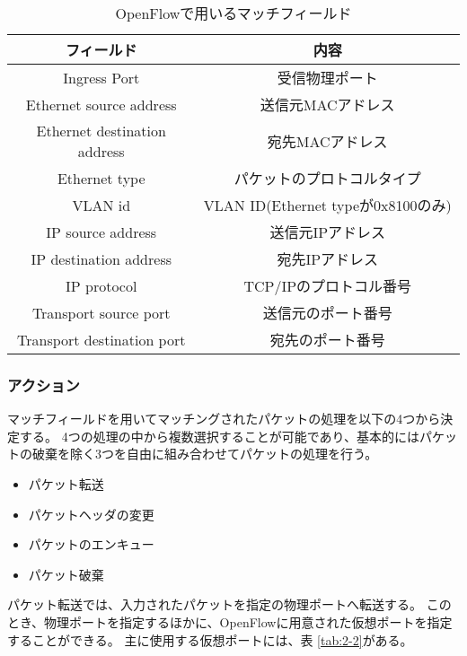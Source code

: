 \begin{table}[tb]
	\begin{center}
		\caption{OpenFlowで用いるマッチフィールド}
		\begin{tabular}{c|c}
			\hline \hline
			フィールド & 内容　\\ \hline
			Ingress Port & 受信物理ポート　\\
			Ethernet source address & 送信元MACアドレス \\
			Ethernet destination address & 宛先MACアドレス　\\
			Ethernet type & パケットのプロトコルタイプ \\
			VLAN id & VLAN ID(Ethernet typeが0x8100のみ)　\\
			IP source address & 送信元IPアドレス　\\
			IP destination address & 宛先IPアドレス　\\
			IP protocol & TCP/IPのプロトコル番号　\\
			Transport source port & 送信元のポート番号　\\
			Transport destination port & 宛先のポート番号\\ \hline
		\end{tabular}
		\label{tab:2-1}
	\end{center}
\end{table}

\subsubsection{アクション}

マッチフィールドを用いてマッチングされたパケットの処理を以下の4つから決定する\cite{openflowjapanese}。
4つの処理の中から複数選択することが可能であり、基本的にはパケットの破棄を除く3つを自由に組み合わせてパケットの処理を行う。

\begin{itemize}
	\item パケット転送
	\item パケットヘッダの変更
	\item パケットのエンキュー
	\item パケット破棄
\end{itemize}

パケット転送では、入力されたパケットを指定の物理ポートへ転送する。
このとき、物理ポートを指定するほかに、OpenFlowに用意された仮想ポートを指定することができる。
主に使用する仮想ポートには、表 \ref{tab:2-2}がある。


